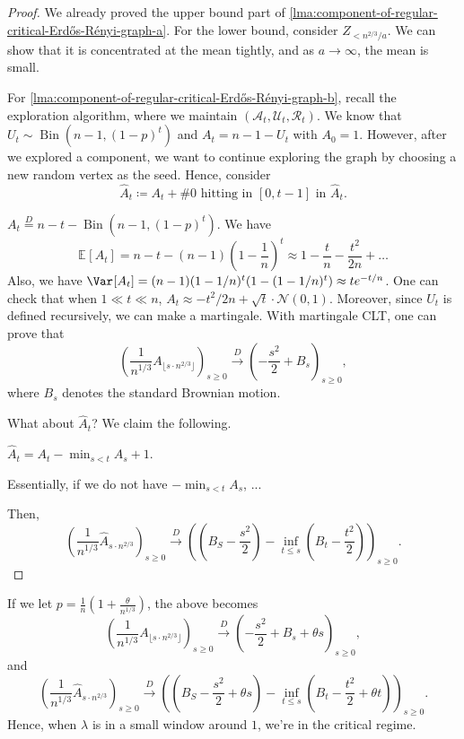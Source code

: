 \begin{proof}
	We already proved the upper bound part of \autoref{lma:component-of-regular-critical-Erdős-Rényi-graph-a}. For the lower bound, consider \(Z_{< n^{2 / 3} / a}\). We can show that it is concentrated at the mean tightly, and as \(a \to \infty \), the mean is small.

	For \autoref{lma:component-of-regular-critical-Erdős-Rényi-graph-b}, recall the exploration algorithm, where we maintain \((\mathcal{A} _t, \mathcal{U} _t, \mathcal{R} _t)\). We know that \(U_t \sim \operatorname{Bin}(n-1, (1-p)^t) \) and \(A_t = n-1-U_t\) with \(A_0 = 1\). However, after we explored a component, we want to continue exploring the graph by choosing a new random vertex as the seed. Hence, consider
	\[
		\hat{A} _t
		\coloneqq A_t + \text{\#0 hitting in \([0, t-1]\) in \(\hat{A}_t\)}.
	\]
	\begin{prev}
		\(A_t \overset{D}{=} n-t-\operatorname{Bin}(n-1, (1-p)^t) \). We have
		\[
			\mathbb{E}_{}[A_t]
			= n-t - (n-1)\left( 1 - \frac{1}{n} \right) ^t
			\approx 1 - \frac{t}{n} - \frac{t^2}{2n} + \dots
		\]
		Also, we have \(\Var_{}[A_t] = (n-1)(1- 1 / n)^t (1 - (1 - 1 / n)^t) \approx t e^{-t / n}\). One can check that when \(1 \ll t \ll n\), \(A_t \approx - t^2 / 2n + \sqrt{t} \cdot \mathcal{N} (0, 1) \). Moreover, since \(U_t\) is defined recursively, we can make a martingale. With martingale CLT, one can prove that
		\[
			\left( \frac{1}{n^{1 / 3}} A_{\lfloor s \cdot n^{2 / 3} \rfloor } \right) _{s \geq 0}
			\overset{D}{\to} \left( - \frac{s^2}{2} + B_s \right) _{s \geq 0},
		\]
		where \(B_s\) denotes the standard Brownian motion.
	\end{prev}

	What about \(\hat{A} _t\)? We claim the following.

	\begin{claim}
		\(\hat{A} _t = A_t - \min _{s < t} A_s + 1\).
	\end{claim}

	\begin{intuition}
		Essentially, if we do not have \(- \min _{s < t} A_s\), ...
	\end{intuition}

	Then,
	\[
		\left( \frac{1}{n^{1 / 3}} \hat{A} _{s \cdot n^{2 / 3}} \right) _{s \geq 0}
		\overset{D}{\to} \left( \left( B_S - \frac{s^2}{2} \right) - \inf _{t \leq s} \left( B_t - \frac{t^2}{2} \right)  \right)_{s \geq 0}.
	\]
\end{proof}

\begin{remark}
	If we let \(p = \frac{1}{n} \left( 1 + \frac{\theta}{n^{1 / 3}} \right) \), the above becomes
	\[
		\left( \frac{1}{n^{1 / 3}} A_{\lfloor s \cdot n^{2 / 3} \rfloor } \right) _{s \geq 0}
		\overset{D}{\to} \left( - \frac{s^2}{2} + B_s + \theta s\right) _{s \geq 0},
	\]
	and
	\[
		\left( \frac{1}{n^{1 / 3}} \hat{A} _{s \cdot n^{2 / 3}} \right) _{s \geq 0}
		\overset{D}{\to} \left( \left( B_S - \frac{s^2}{2} + \theta s\right) - \inf _{t \leq s} \left( B_t - \frac{t^2}{2} + \theta t \right)  \right)_{s \geq 0}.
	\]
	Hence, when \(\lambda \) is in a small window around \(1\), we're in the critical regime.
\end{remark}

